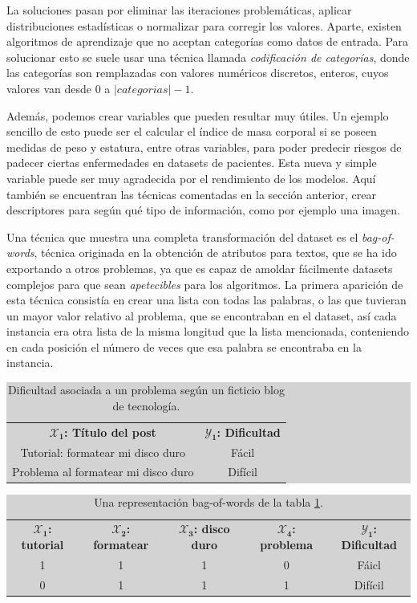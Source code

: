 La soluciones pasan por eliminar las iteraciones problemáticas, aplicar distribuciones estadísticas o normalizar para corregir los valores. Aparte, existen algoritmos de aprendizaje que no aceptan categorías como datos de entrada. Para solucionar esto se suele usar una técnica llamada \emph{codificación de categorías}, donde las categorías son remplazadas con valores numéricos discretos, enteros, cuyos valores van desde $0$ a $|categorias| - 1$.

Además, podemos crear variables que pueden resultar muy útiles. Un ejemplo sencillo de esto puede ser el calcular el índice de masa corporal si se poseen medidas de peso y estatura, entre otras variables, para poder predecir riesgos de padecer ciertas enfermedades en datasets de pacientes. Esta nueva y simple variable puede ser muy agradecida por el rendimiento de los modelos. Aquí también se encuentran las técnicas comentadas en la sección anterior, crear descriptores para según qué tipo de información, como por ejemplo una imagen.

Una técnica que muestra una completa transformación del dataset es el \emph{bag-of-words}, técnica originada en la obtención de atributos para textos, que se ha ido exportando a otros problemas, ya que es capaz de amoldar fácilmente datasets complejos para que sean \emph{apetecibles} para los algoritmos. La primera aparición de esta técnica consistía en crear una lista con todas las palabras, o las que tuvieran un mayor valor relativo al problema, que se encontraban en el dataset, así cada instancia era otra lista de la misma longitud que la lista mencionada, conteniendo en cada posición el número de veces que esa palabra se encontraba en la instancia. 

\begin{table}[ht]
\centering
\colorbox{lightgray}{\begin{tabular}{c | c} 
  $\mathbf{\mathcal{X}_{1}}$\textbf{: Título del post} & $\mathbf{\mathcal{Y}_{1}}$\textbf{: Dificultad} \\
  Tutorial: formatear mi disco duro & Fácil \\
  Problema al formatear mi disco duro & Difícil
\end{tabular}}
\caption{Dificultad asociada a un problema según un ficticio blog de tecnología.}
\label{table:2.2}
\end{table}

\begin{table}[ht]
\begin{adjustwidth}{-20mm}{-20mm}
\centering
\colorbox{lightgray}{\begin{tabular}{*{4}{c} | c} 
  $\mathbf{\mathcal{X}_{1}}$\textbf{: tutorial} & $\mathbf{\mathcal{X}_{2}}$\textbf{: formatear} & $\mathbf{\mathcal{X}_{3}}$\textbf{: disco duro} & $\mathbf{\mathcal{X}_{4}}$\textbf{: problema} & $\mathbf{\mathcal{Y}_{1}}$\textbf{: Dificultad} \\
  1 & 1 & 1 & 0 & Fáicl \\
  0 & 1 & 1 & 1 & Difícil
\end{tabular}}
\caption{Una representación bag-of-words de la tabla \ref{table:2.2}.}
\label{table:2.3}
\end{adjustwidth}
\end{table}

